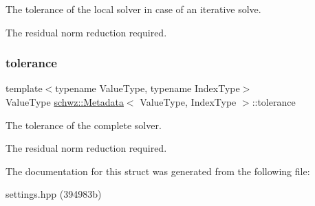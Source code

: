 The tolerance of the local solver in case of an iterative solve. 

The residual norm reduction required. \mbox{\label{structschwz_1_1Metadata_a366db94e2a75dbdd82616e0d0b33bb86}} 
\subsubsection{\texorpdfstring{tolerance}{tolerance}}
{\footnotesize\ttfamily template$<$typename Value\+Type, typename Index\+Type$>$ \\
Value\+Type \hyperlink{structschwz_1_1Metadata}{schwz\+::\+Metadata}$<$ Value\+Type, Index\+Type $>$\+::tolerance}



The tolerance of the complete solver. 

The residual norm reduction required. 

The documentation for this struct was generated from the following file\+:\begin{DoxyCompactItemize}
\item 
settings.\+hpp (394983b)\end{DoxyCompactItemize}
